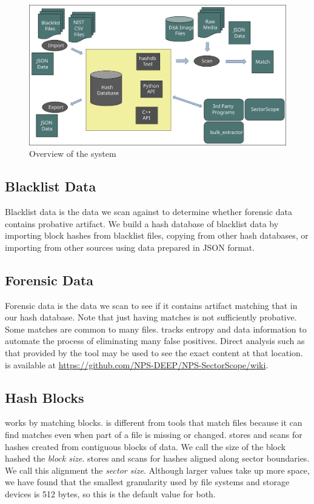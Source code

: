 \documentclass[11pt,fleqn]{article} %
\begin{document}
\begin{figure}
	\center
	\includegraphics[scale=.45]{drawings/hashdb_system_overview}
	\caption{Overview of the \hdb system}
	\label{fig:overviewFigure}
\end{figure}

\subsection{Blacklist Data}
Blacklist data is the data we scan against to determine whether forensic data
contains probative artifact.
We build a hash database of blacklist data by importing block hashes
from blacklist files, copying from other hash databases,
or importing from other sources using data prepared in JSON format.

\subsection{Forensic Data}
Forensic data is the data we scan to see if it contains artifact matching
that in our hash database.
Note that just having matches is not sufficiently probative.
Some matches are common to many files.
\hdb tracks entropy and data information to automate the process
of eliminating many false positives.
Direct analysis such as that provided by the \sscope tool
may be used to see the exact content at that location.
\sscope is available at \url{https://github.com/NPS-DEEP/NPS-SectorScope/wiki}.

\subsection{Hash Blocks}
\label{HashBlocks}
\hdb works by matching blocks.
\hdb is different from tools that match files because it can find matches
even when part of a file is missing or changed.
\hdb stores and scans for hashes created from contiguous blocks of data.
We call the size of the block hashed the \textit{block size}.
\hdb stores and scans for hashes aligned along sector boundaries.
We call this alignment the \textit{sector size}.
Although larger values take up more space, we have found that the smallest
granularity used by file systems and storage devices is 512 bytes,
so this is the default value for both.
\end{document}
